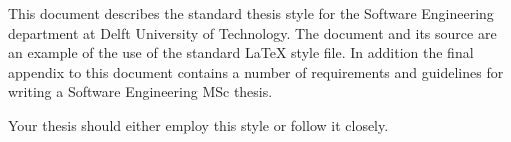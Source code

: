 This document describes the standard thesis style for the Software
Engineering department at Delft University of Technology. The document
and its source are an example of the use of the standard \LaTeX{} style
file. In addition the final appendix to this document contains a
number of requirements and guidelines for writing a Software
Engineering MSc thesis.

Your thesis should either employ this style or follow it closely.


